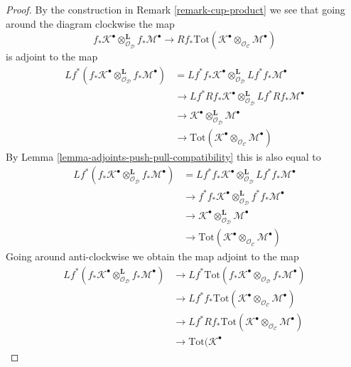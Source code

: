 \documentclass[10pt,a4paper]{amsart}
\theoremstyle{plain}
\theoremstyle{definition}
\theoremstyle{remark}
\numberwithin{equation}{subsection}
\begin{document}
\begin{proof}
By the construction in Remark \ref{remark-cup-product} we see that
going around the diagram clockwise the map
$$
f_*\mathcal{K}^\bullet
\otimes_{\mathcal{O}_\mathcal{D}}^\mathbf{L}
f_*\mathcal{M}^\bullet 
\longrightarrow
Rf_*\text{Tot}(\mathcal{K}^\bullet
\otimes_{\mathcal{O}_\mathcal{C}}
\mathcal{M}^\bullet)
$$
is adjoint to the map
\begin{align*}
Lf^*(f_*\mathcal{K}^\bullet
\otimes_{\mathcal{O}_\mathcal{D}}^\mathbf{L}
f_*\mathcal{M}^\bullet)
& =
Lf^*f_*\mathcal{K}^\bullet
\otimes_{\mathcal{O}_\mathcal{D}}^\mathbf{L}
Lf^*f_*\mathcal{M}^\bullet \\
& \to
Lf^*Rf_*\mathcal{K}^\bullet
\otimes_{\mathcal{O}_\mathcal{D}}^\mathbf{L}
Lf^*Rf_*\mathcal{M}^\bullet \\
& \to
\mathcal{K}^\bullet
\otimes_{\mathcal{O}_\mathcal{D}}^\mathbf{L}
\mathcal{M}^\bullet \\
& \to
\text{Tot}(\mathcal{K}^\bullet
\otimes_{\mathcal{O}_\mathcal{C}}
\mathcal{M}^\bullet)
\end{align*}
By Lemma \ref{lemma-adjoints-push-pull-compatibility} this is also equal to
\begin{align*}
Lf^*(f_*\mathcal{K}^\bullet
\otimes_{\mathcal{O}_\mathcal{D}}^\mathbf{L}
f_*\mathcal{M}^\bullet)
& =
Lf^*f_*\mathcal{K}^\bullet
\otimes_{\mathcal{O}_\mathcal{D}}^\mathbf{L}
Lf^*f_*\mathcal{M}^\bullet \\
& \to
f^*f_*\mathcal{K}^\bullet
\otimes_{\mathcal{O}_\mathcal{D}}^\mathbf{L}
f^*f_*\mathcal{M}^\bullet \\
& \to
\mathcal{K}^\bullet
\otimes_{\mathcal{O}_\mathcal{D}}^\mathbf{L}
\mathcal{M}^\bullet \\
& \to
\text{Tot}(\mathcal{K}^\bullet
\otimes_{\mathcal{O}_\mathcal{C}}
\mathcal{M}^\bullet)
\end{align*}
Going around anti-clockwise we obtain the map adjoint to the map
\begin{align*}
Lf^*(f_*\mathcal{K}^\bullet
\otimes_{\mathcal{O}_\mathcal{D}}^\mathbf{L}
f_*\mathcal{M}^\bullet)
& \to
Lf^*\text{Tot}(
f_*\mathcal{K}^\bullet
\otimes_{\mathcal{O}_\mathcal{D}}
f_*\mathcal{M}^\bullet) \\
& \to
Lf^*f_*\text{Tot}(\mathcal{K}^\bullet
\otimes_{\mathcal{O}_\mathcal{C}}
\mathcal{M}^\bullet) \\
& \to
Lf^*Rf_*\text{Tot}(\mathcal{K}^\bullet
\otimes_{\mathcal{O}_\mathcal{C}}
\mathcal{M}^\bullet) \\
& \to
\text{Tot}(\mathcal{K}^\bullet

\end{align*}
\end{proof}
\end{document}
